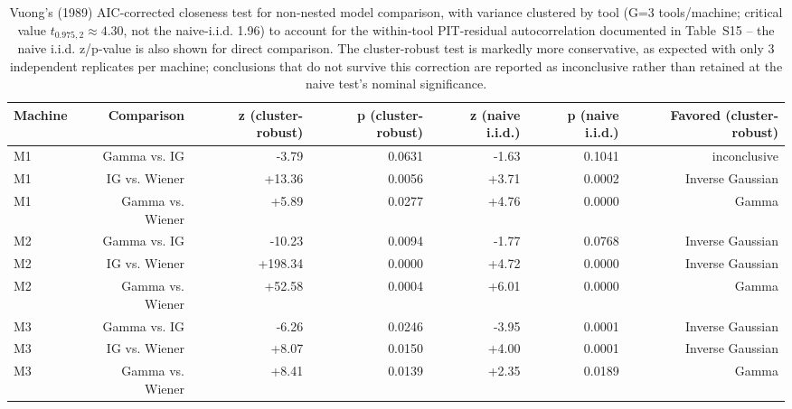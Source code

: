 \begin{table}[t]
\centering
\caption{Vuong's (1989) AIC-corrected closeness test for non-nested model comparison, with variance clustered by tool (G=3 tools/machine; critical value $t_{0.975,2} \approx 4.30$, not the naive-i.i.d. 1.96) to account for the within-tool PIT-residual autocorrelation documented in Table~S15 -- the naive i.i.d. z/p-value is also shown for direct comparison. The cluster-robust test is markedly more conservative, as expected with only 3 independent replicates per machine; conclusions that do not survive this correction are reported as inconclusive rather than retained at the naive test's nominal significance.}
\label{tab:vuong-test}
\begin{tabular}{lrrrrrr}
\toprule
Machine & Comparison & z (cluster-robust) & p (cluster-robust) & z (naive i.i.d.) & p (naive i.i.d.) & Favored (cluster-robust) \\
\midrule
M1 & Gamma vs. IG & -3.79 & 0.0631 & -1.63 & 0.1041 & inconclusive \\
M1 & IG vs. Wiener & +13.36 & 0.0056 & +3.71 & 0.0002 & Inverse Gaussian \\
M1 & Gamma vs. Wiener & +5.89 & 0.0277 & +4.76 & 0.0000 & Gamma \\
M2 & Gamma vs. IG & -10.23 & 0.0094 & -1.77 & 0.0768 & Inverse Gaussian \\
M2 & IG vs. Wiener & +198.34 & 0.0000 & +4.72 & 0.0000 & Inverse Gaussian \\
M2 & Gamma vs. Wiener & +52.58 & 0.0004 & +6.01 & 0.0000 & Gamma \\
M3 & Gamma vs. IG & -6.26 & 0.0246 & -3.95 & 0.0001 & Inverse Gaussian \\
M3 & IG vs. Wiener & +8.07 & 0.0150 & +4.00 & 0.0001 & Inverse Gaussian \\
M3 & Gamma vs. Wiener & +8.41 & 0.0139 & +2.35 & 0.0189 & Gamma \\
\bottomrule
\end{tabular}
\end{table}
